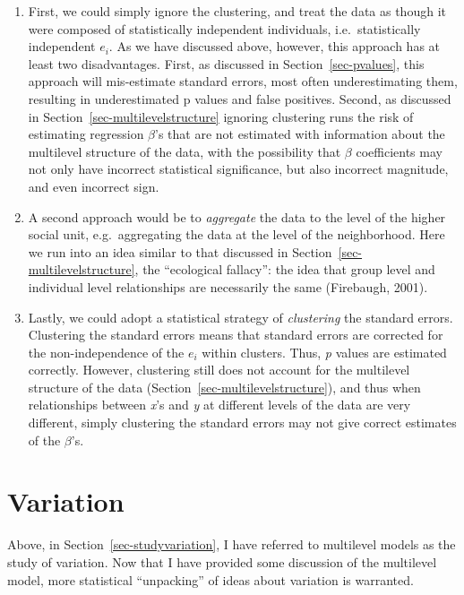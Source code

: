 \documentclass[
  letterpaper,
  DIV=11,
  numbers=noendperiod]{scrreprt}
\providecommand{\tightlist}{%
  \setlength{\itemsep}{0pt}\setlength{\parskip}{0pt}}\usepackage{longtable,booktabs,array}
\begin{document}
\begin{enumerate}
\def\labelenumi{\arabic{enumi}.}
\tightlist
\item
  First, we could simply ignore the clustering, and treat the data as
  though it were composed of statistically independent individuals,
  i.e.~statistically independent \(e_i\). As we have discussed above,
  however, this approach has at least two disadvantages. First, as
  discussed in Section~\ref{sec-pvalues}, this approach will
  mis-estimate standard errors, most often underestimating them,
  resulting in underestimated p values and false positives. Second, as
  discussed in Section~\ref{sec-multilevelstructure} ignoring clustering
  runs the risk of estimating regression \(\beta\)'s that are not
  estimated with information about the multilevel structure of the data,
  with the possibility that \(\beta\) coefficients may not only have
  incorrect statistical significance, but also incorrect magnitude, and
  even incorrect sign.
\item
  A second approach would be to \emph{aggregate} the data to the level
  of the higher social unit, e.g.~aggregating the data at the level of
  the neighborhood. Here we run into an idea similar to that discussed
  in Section~\ref{sec-multilevelstructure}, the ``ecological fallacy'':
  the idea that group level and individual level relationships are
  necessarily the same (Firebaugh, 2001).
\item
  Lastly, we could adopt a statistical strategy of \emph{clustering} the
  standard errors. Clustering the standard errors means that standard
  errors are corrected for the non-independence of the \(e_i\) within
  clusters. Thus, \emph{p} values are estimated correctly. However,
  clustering still does not account for the multilevel structure of the
  data (Section~\ref{sec-multilevelstructure}), and thus when
  relationships between \emph{x}'s and \emph{y} at different levels of
  the data are very different, simply clustering the standard errors may
  not give correct estimates of the \(\beta\)'s.
\end{enumerate}

\section{Variation}\label{variation}

Above, in Section~\ref{sec-studyvariation}, I have referred to
multilevel models as the study of variation. Now that I have provided
some discussion of the multilevel model, more statistical ``unpacking''
of ideas about variation is warranted.
\end{document}
